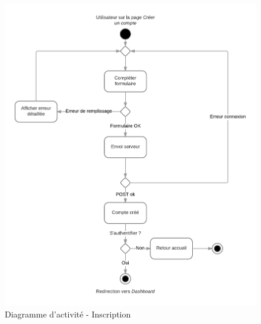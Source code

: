 \documentclass[titlepage]{report}
\begin{document}
\begin{figure}[h]
	\caption{Diagramme d'activité - Inscription}
	\label{annexe_diagramme_activite_inscription}
	\centering
	\includegraphics[width=\textwidth]{figures/diagrammes/activite_inscription.png}
\end{figure}
\end{document}
